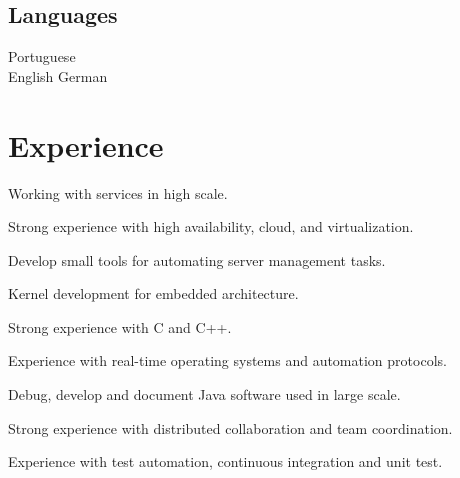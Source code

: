 \documentclass[]{deedy-resume-openfont}
\begin{document}
\begin{minipage}[t]{0.33\textwidth}
\subsection{Languages}
Portuguese \\
English \textbullet{}
German


\end{minipage} 
\hfill
\begin{minipage}[t]{0.66\textwidth} 

\section{Experience}
\sectionsep
\begin{tightemize}
\item Working with services in high scale.
\item Strong experience with high availability, cloud, and virtualization.
\item Develop small tools for automating server management tasks.
\end{tightemize}
\sectionsep

\begin{tightemize}
\item Kernel development for embedded architecture.
\item Strong experience with C and C++.
\item Experience with real-time operating systems and automation protocols.
\end{tightemize}
\sectionsep

\begin{tightemize}
\item Debug, develop and document Java software used in large scale.
\item Strong experience with distributed collaboration and team coordination.
\item Experience with test automation, continuous integration and unit test.
\end{tightemize}
\sectionsep


\end{minipage}
\end{document}
